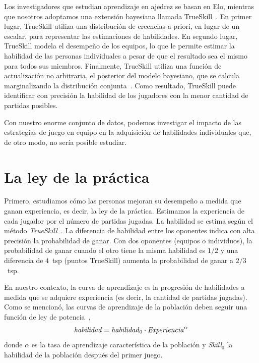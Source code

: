 \documentclass[a4paper,11pt]{book}
\theoremstyle{definition}
\begin{document}

Los investigadores que estudian aprendizaje en ajedrez se basan en Elo, mientras que nosotros adoptamos una extensi\'on bayesiana llamada TrueSkill~\cite{Herbrich2007}.
%
En primer lugar, TrueSkill utiliza una distribuci\'on de creencias a priori, en lugar de un escalar, para representar las estimaciones de habilidades.
%
En segundo lugar, TrueSkill modela el desempe\~no de los equipos, lo que le permite estimar la habilidad de las personas individuales a pesar de que el resultado sea el mismo para todos sus miembros.
%
Finalmente, TrueSkill utiliza una funci\'on de actualizaci\'on no arbitraria, el posterior del modelo bayesiano, que se calcula marginalizando la distribuci\'on conjunta~\cite{Kschischang2001}.
%
Como resultado, TrueSkill puede identificar con precisi\'on la habilidad de los jugadores con la menor cantidad de partidas posibles.


Con nuestro enorme conjunto de datos, podemos investigar el impacto de las estrategias de juego en equipo en la adquisici\'on de habilidades individuales que, de otro modo, no ser\'ia posible estudiar.

\section{La ley de la pr\'actica}

Primero, estudiamos c\'omo las personas mejoran su desempe\~no a medida que ganan experiencia, es decir, la ley de la pr\'actica.
%
Estimamos la experiencia de cada jugador por el n\'umero de partidas jugadas.
%
La habilidad se estima seg\'un el m\'etodo \emph{TrueSkill}~\cite{Herbrich2007}.
%
La diferencia de habilidad entre los oponentes indica con alta precisi\'on la probabilidad de ganar.
%
Con dos oponentes (equipos o individuos), la probabilidad de ganar cuando el otro tiene la misma habilidad es $1/2$ y una diferencia de $4$~tsp (puntos TrueSkill) aumenta la probabilidad de ganar a $2/3$~tsp.


En nuestro contexto, la curva de aprendizaje es la progresi\'on de habilidades a medida que se adquiere experiencia (es decir, la cantidad de partidas jugadas).
%
Como se mencion\'o, las curvas de aprendizaje de la poblaci\'on deben seguir una funci\'on de ley de potencia~\cite{Newell1981},
%
\begin{equation}\label{lawOfPractice}
   \text{\emph{habilidad}} = \text{\emph{habilidad}}_0 \cdot \text{\emph{Experiencia}}^{\alpha}
\end{equation}
%
donde $\alpha$ es la tasa de aprendizaje caracter\'istica de la poblaci\'on y \emph{Skill}$_0$ la habilidad de la poblaci\'on despu\'es del primer juego.
\end{document}
